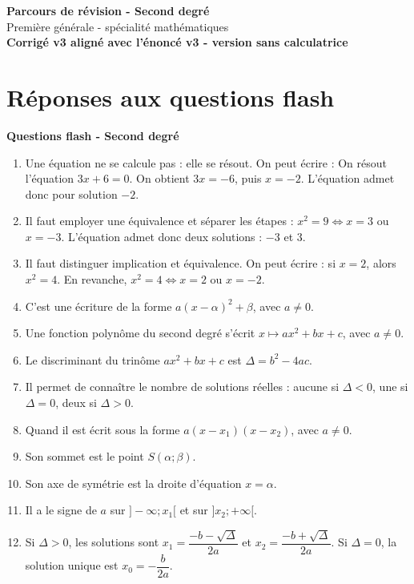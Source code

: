 \documentclass[10pt,a4paper]{article}
\newcommand{\titrepartie}[1]{\vspace{0.35em}\noindent\colorbox{lightgraybox}{\parbox{\dimexpr\linewidth-2\fboxsep}{\textbf{#1}}}\vspace{0.35em}}
\begin{document}
\begin{center}
{\Large \textbf{Parcours de révision - Second degré}}\\[0.25em]
{\large Première générale - spécialité mathématiques}\\[0.2em]
\textbf{Corrigé v3 aligné avec l'énoncé v3 - version sans calculatrice}
\end{center}

\tableofcontents
\newpage

\section{Réponses aux questions flash}
\titrepartie{Questions flash - Second degré}

\begin{enumerate}[leftmargin=*, itemsep=0.35em]
\item Une équation ne se calcule pas : elle se résout. On peut écrire : \og On résout l'équation $3x+6=0$. On obtient $3x=-6$, puis $x=-2$. L'équation admet donc pour solution $-2$. \fg{}
\item Il faut employer une équivalence et séparer les étapes : $x^2=9 \Longleftrightarrow x=3$ ou $x=-3$. L'équation admet donc deux solutions : $-3$ et $3$.
\item Il faut distinguer implication et équivalence. On peut écrire : si $x=2$, alors $x^2=4$. En revanche, $x^2=4 \Longleftrightarrow x=2$ ou $x=-2$.
\item C'est une écriture de la forme $a(x-\alpha)^2+\beta$, avec $a\neq 0$.
\item Une fonction polynôme du second degré s'écrit $x\mapsto ax^2+bx+c$, avec $a\neq 0$.
\item Le discriminant du trinôme $ax^2+bx+c$ est $\Delta=b^2-4ac$.
\item Il permet de connaître le nombre de solutions réelles : aucune si $\Delta<0$, une si $\Delta=0$, deux si $\Delta>0$.
\item Quand il est écrit sous la forme $a(x-x_1)(x-x_2)$, avec $a\neq 0$.
\item Son sommet est le point $S(\alpha;\beta)$.
\item Son axe de symétrie est la droite d'équation $x=\alpha$.
\item Il a le signe de $a$ sur $]-\infty;x_1[$ et sur $]x_2;+\infty[$.
\item Si $\Delta>0$, les solutions sont $x_1=\dfrac{-b-\sqrt{\Delta}}{2a}$ et $x_2=\dfrac{-b+\sqrt{\Delta}}{2a}$. Si $\Delta=0$, la solution unique est $x_0=-\dfrac{b}{2a}$.

\end{enumerate}
\end{document}
